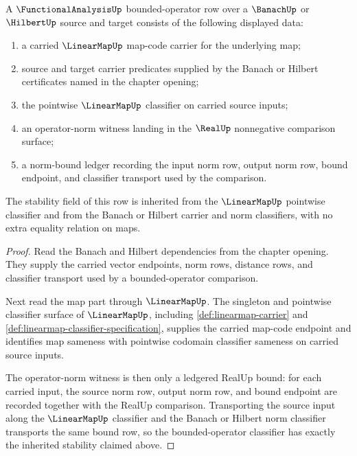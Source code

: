 \begin{theorem}
\label{thm:functionalanalysis-bounded-linear-operator-obligation}
A $\FunctionalAnalysisUp$ bounded-operator row over a $\BanachUp$ or
$\HilbertUp$ source and target consists of the following displayed data:
\begin{enumerate}
  \item a carried $\LinearMapUp$ map-code carrier for the underlying map;
  \item source and target carrier predicates supplied by the Banach or Hilbert
  certificates named in the chapter opening;
  \item the pointwise $\LinearMapUp$ classifier on carried source inputs;
  \item an operator-norm witness landing in the $\RealUp$ nonnegative
  comparison surface;
  \item a norm-bound ledger recording the input norm row, output norm row,
  bound endpoint, and classifier transport used by the comparison.
\end{enumerate}
The stability field of this row is inherited from the $\LinearMapUp$
pointwise classifier and from the Banach or Hilbert carrier and norm
classifiers, with no extra equality relation on maps.
\end{theorem}
\begin{proof}
Read the Banach and Hilbert dependencies from the chapter opening. They supply
the carried vector endpoints, norm rows, distance rows, and classifier
transport used by a bounded-operator comparison.

Next read the map part through $\LinearMapUp$. The singleton and pointwise
classifier surface of $\LinearMapUp$, including
\autoref{def:linearmap-carrier} and
\autoref{def:linearmap-classifier-specification}, supplies the carried
map-code endpoint and identifies map sameness with pointwise codomain
classifier sameness on carried source inputs.

The operator-norm witness is then only a ledgered RealUp bound: for each
carried input, the source norm row, output norm row, and bound endpoint are
recorded together with the RealUp comparison. Transporting the source input
along the $\LinearMapUp$ classifier and the Banach or Hilbert norm classifier
transports the same bound row, so the bounded-operator classifier has exactly
the inherited stability claimed above.
\end{proof}


